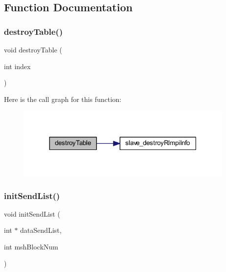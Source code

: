 \subsection{Function Documentation}
\mbox{\label{register_8C_a099f07ebad307cc1509766f32cfcba5f}} 
\subsubsection{\texorpdfstring{destroyTable()}{destroyTable()}}
{\footnotesize\ttfamily void destroy\+Table (\begin{DoxyParamCaption}\item[{int}]{index }\end{DoxyParamCaption})}

Here is the call graph for this function\+:
\nopagebreak
\begin{figure}[H]
\begin{center}
\leavevmode
\includegraphics[width=304pt]{register_8C_a099f07ebad307cc1509766f32cfcba5f_cgraph}
\end{center}
\end{figure}
\mbox{\label{register_8C_a4e113cf30f6198d50fb212074effcc61}} 
\subsubsection{\texorpdfstring{initSendList()}{initSendList()}\hspace{0.1cm}{\footnotesize\ttfamily [1/2]}}
{\footnotesize\ttfamily void init\+Send\+List (\begin{DoxyParamCaption}\item[{int $\ast$}]{data\+Send\+List,  }\item[{int}]{msh\+Block\+Num }\end{DoxyParamCaption})}

